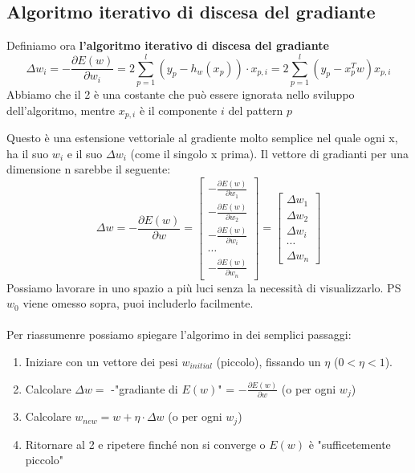 \subsection{Algoritmo iterativo di discesa del gradiante}
\begin{definition}
    Definiamo ora \textbf{l'algoritmo iterativo di discesa del gradiante}
    $$\Delta w_i = -\frac{\partial E(w)}{\partial w_i} = 2\sum_{p=1}^{l}(y_p - h_w(x_p)) \cdot x_{p,i} = 2\sum_{p=1}^{l}(y_p - x_p^T w)x_{p,i}$$
    Abbiamo che il 2 è una costante che può essere ignorata nello sviluppo dell'algoritmo, mentre $x_{p,i}$ è il componente $i$ del pattern $p$
\end{definition}
\hspace{-15pt}Questo è una estensione vettoriale al gradiente molto semplice nel quale ogni x, ha il suo $w_i$ e il suo $\Delta w_i$ (come il singolo x prima).
Il vettore di gradianti per una dimensione n sarebbe il seguente:
$$
\Delta w = -\frac{\partial E(w)}{\partial w} = 
\begin{bmatrix}
    -\frac{\partial E(w)}{\partial w_1}\\
    -\frac{\partial E(w)}{\partial w_2}\\
    -\frac{\partial E(w)}{\partial w_i}\\
    \cdots\\
    -\frac{\partial E(w)}{\partial w_n}
\end{bmatrix}
= 
\begin{bmatrix}
    \Delta w_1\\
    \Delta w_2\\
    \Delta w_i\\
    \cdots \\
    \Delta w_n
\end{bmatrix}
$$
Possiamo lavorare in uno spazio a più luci senza la necessità di visualizzarlo. PS $w_0$ viene omesso sopra, puoi includerlo facilmente.\\\\
Per riassumenre possiamo spiegare l'algorimo in dei semplici passaggi:
\begin{enumerate}
    \item Iniziare con un vettore dei pesi $w_{initial}$ (piccolo), fissando un $\eta$ ($0 < \eta < 1$).
    \item Calcolare $\Delta w =$ -"gradiante di $E(w)$" = $-\frac{\partial E(w)}{\partial w}$ (o per ogni $w_j$)
    \item Calcolare $w_{new} = w + \eta \cdot \Delta w$ (o per ogni $w_j$) 
    \item Ritornare al 2 e ripetere finché non si converge o $E(w)$ è "sufficetemente piccolo"
\end{enumerate}
